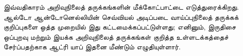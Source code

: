 \documentclass[../../../include/open-logic-chapter]{subfiles}
\begin{document}

\begin{editorial}
  இவ்வதிகாரம் அறிவுநிலைத் தருக்கங்களின் மீக்கோட்பாட்டை எடுத்துரைக்கிறது.
  ஆல்டோ ஆன்டோனெல்லியின் செவ்வியல் அடிப்படை வாய்ப்புநிலைத் தருக்கக் குறிப்புகளை
  ஒத்த முறையில் இது கட்டமைக்கப்பட்டுள்ளது; எனினும், இருதிசை ஒப்புறவு மற்றும்
  இயக்க அறிவுநிலைத் தருக்கங்கள் குறித்த உள்ளடக்கத்தைச் சேர்ப்பதற்காக ஆட்ரி
  யாப் இதனை மீண்டும் எழுதியுள்ளார்.
\end{editorial}



\OLEndChapterHook
\end{document}
